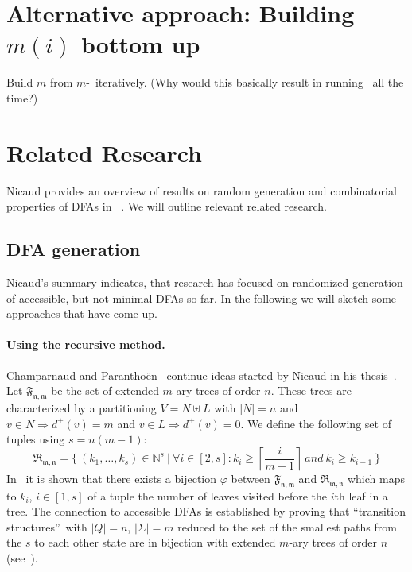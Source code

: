 \section{Alternative approach: Building $m(i)$ bottom up}

Build $m$ from $m$-\CompDist\ iteratively. (Why would this basically result in running \CompDist\ all the time?)

\section{Related Research}

Nicaud provides an overview of results on random generation and combinatorial properties of DFAs in ~\cite{Nic14}. We will outline relevant related research.

\subsection{DFA generation}

Nicaud's summary indicates, that research has focused on randomized generation of accessible, but not minimal DFAs so far. In the following we will sketch some approaches that have come up.

\paragraph*{Using the recursive method.}

Champarnaud and Paranthoën~\cite{CP05} continue ideas started by Nicaud in his thesis~\cite{Nic00}. Let $\mathfrak{F_{n,m}}$ be the set of extended $m$-ary trees of order $n$. These trees are characterized by a partitioning $V = N \uplus L$ with $|N| = n$ and $v \in N \Rightarrow d^+(v) = m$ and $v \in L \Rightarrow d^+(v) = 0$. We define the following set of tuples using $s=n(m-1)$:
\[
    \mathfrak{R_{m,n}} = \{\ (k_1,\ldots,k_s) \in \mathbb{N}^s\ |\ \forall i\in [2,s]\colon k_i \geq \left\lceil\frac{i}{m-1}\right\rceil\ and\ k_i \geq k_{i-1}\ \}
\]
In~\cite[p. 6]{CP05} it is shown that there exists a bijection $\varphi$ between $\mathfrak{F_{n,m}}$ and $\mathfrak{R_{m,n}}$ which maps to $k_i$, $i\in[1,s]$ of a tuple the number of leaves visited before the $i$th leaf in a tree. The connection to accessible DFAs is established by proving that  ``transition structures\footnotemark''\ with $|Q|=n$, $|\Sigma|=m$ reduced to the set of the smallest paths from the $s$ to each other state are in bijection with extended $m$-ary trees of order $n$ (see~\cite[p. 8]{CP05}).

